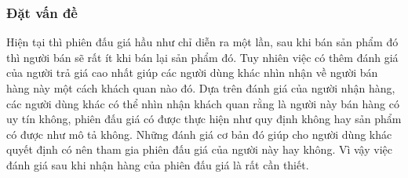 \documentclass{article}
\begin{document}
\subsubsection{Đặt vấn đề}
Hiện tại thì phiên đấu giá hầu như chỉ diễn ra một lần, sau khi bán sản phẩm đó thì người bán sẽ rất ít khi bán lại sản phẩm đó. Tuy nhiên việc có thêm đánh giá của người trả giá cao nhất giúp các người dùng khác nhìn nhận về người bán hàng này một cách khách quan nào đó. Dựa trên đánh giá của người nhận hàng, các người dùng khác có thể nhìn nhận khách quan rằng là người này bán hàng có uy tín không, phiên đấu giá có được thực hiện như quy định không hay sản phẩm có được như mô tả không. Những đánh giá cơ bản đó giúp cho người dùng khác quyết định có nên tham gia phiên đấu giá của người này hay không. Vì vậy việc đánh giá sau khi nhận hàng của phiên đấu giá là rất cần thiết. 
\end{document}
